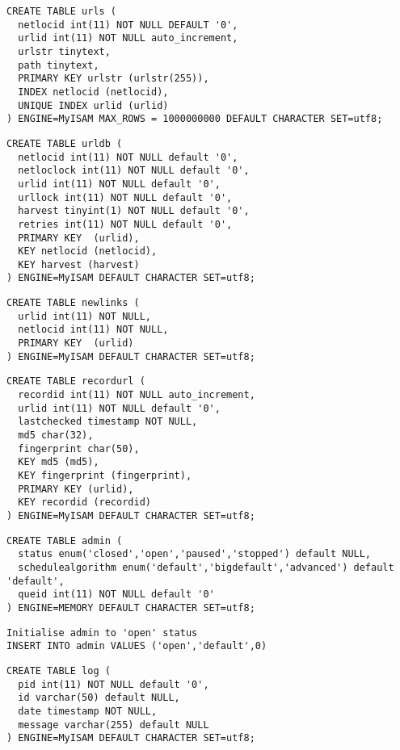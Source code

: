 \begin{verbatim}
CREATE TABLE urls (
  netlocid int(11) NOT NULL DEFAULT '0',
  urlid int(11) NOT NULL auto_increment,
  urlstr tinytext,
  path tinytext,
  PRIMARY KEY urlstr (urlstr(255)),
  INDEX netlocid (netlocid),
  UNIQUE INDEX urlid (urlid)
) ENGINE=MyISAM MAX_ROWS = 1000000000 DEFAULT CHARACTER SET=utf8;
\end{verbatim}

\begin{verbatim}
CREATE TABLE urldb (
  netlocid int(11) NOT NULL default '0',
  netloclock int(11) NOT NULL default '0',
  urlid int(11) NOT NULL default '0',
  urllock int(11) NOT NULL default '0',
  harvest tinyint(1) NOT NULL default '0',
  retries int(11) NOT NULL default '0',
  PRIMARY KEY  (urlid),
  KEY netlocid (netlocid),
  KEY harvest (harvest)
) ENGINE=MyISAM DEFAULT CHARACTER SET=utf8;
\end{verbatim}

\begin{verbatim}
CREATE TABLE newlinks (
  urlid int(11) NOT NULL,
  netlocid int(11) NOT NULL,
  PRIMARY KEY  (urlid)
) ENGINE=MyISAM DEFAULT CHARACTER SET=utf8;
\end{verbatim}

\begin{verbatim}
CREATE TABLE recordurl (
  recordid int(11) NOT NULL auto_increment,
  urlid int(11) NOT NULL default '0',
  lastchecked timestamp NOT NULL,
  md5 char(32),
  fingerprint char(50),
  KEY md5 (md5),
  KEY fingerprint (fingerprint),
  PRIMARY KEY (urlid),
  KEY recordid (recordid)
) ENGINE=MyISAM DEFAULT CHARACTER SET=utf8;
\end{verbatim}

\begin{verbatim}
CREATE TABLE admin (
  status enum('closed','open','paused','stopped') default NULL,
  schedulealgorithm enum('default','bigdefault','advanced') default 'default',
  queid int(11) NOT NULL default '0'
) ENGINE=MEMORY DEFAULT CHARACTER SET=utf8;
\end{verbatim}

\verb+Initialise admin to 'open' status+\\
\verb+INSERT INTO admin VALUES ('open','default',0)+\\
\begin{verbatim}
CREATE TABLE log (
  pid int(11) NOT NULL default '0',
  id varchar(50) default NULL,
  date timestamp NOT NULL,
  message varchar(255) default NULL
) ENGINE=MyISAM DEFAULT CHARACTER SET=utf8;
\end{verbatim}

